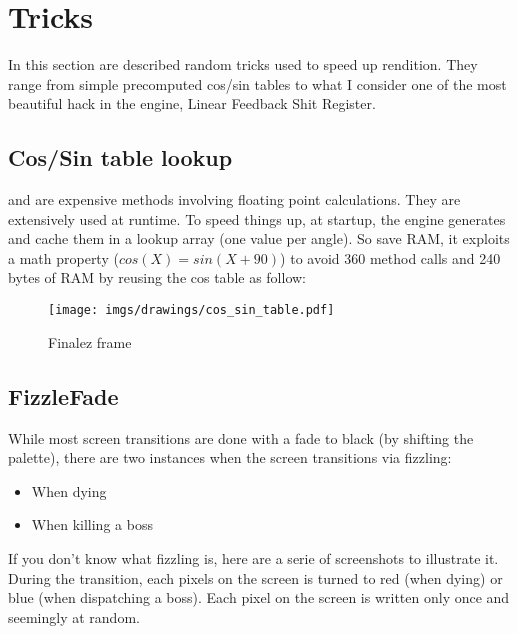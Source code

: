 \section{Tricks}

In this section are described random tricks used to speed up rendition. They range from simple precomputed cos/sin tables to what I consider one of the most beautiful hack in the engine, Linear Feedback Shit Register.




\subsection{Cos/Sin table lookup}
 and  are expensive methods involving floating point calculations. They are extensively used at runtime. To speed things up, at startup, the engine generates and cache them in a lookup array (one value per angle). So save RAM, it exploits a math property ($cos(X) = sin(X + 90)$) to avoid 360  method calls and 240 bytes of RAM by reusing the cos table as follow:\\
\par

\begin{minipage}{\textwidth}

\end{minipage}


\begin{figure}[H]
 \centering
  \texttt{[image: imgs/drawings/cos\_sin\_table.pdf]}
 \caption{Finalez frame} 
\end{figure}








\subsection{FizzleFade}
While most screen transitions are done with a fade to black (by shifting the palette), there are two instances when the screen transitions via fizzling:
\begin{itemize}
	\item When dying
	\item When killing a boss
\end{itemize}
If you don't know what fizzling is, here are a serie of screenshots to illustrate it. During the transition, each pixels on the screen is turned to red (when dying) or blue (when dispatching a boss). Each pixel on the screen is written only once and seemingly at random. 



